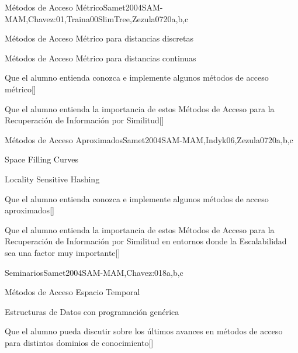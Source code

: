 \begin{syllabus}
\begin{unit}{Métodos de Acceso Métrico}{}{Samet2004SAM-MAM,Chavez:01,Traina00SlimTree,Zezula07}{20}{a,b,c}
   \begin{topics}
         \item Métodos de Acceso Métrico para distancias discretas
         \item Métodos de Acceso Métrico para distancias continuas
   \end{topics}
   \begin{learningoutcomes}
         \item Que el alumno entienda conozca e implemente algunos métodos de acceso métrico[\Usage]
         \item Que el alumno entienda la importancia de estos Métodos de Acceso para la Recuperación de Información por Similitud[\Usage]
   \end{learningoutcomes}
\end{unit}

\begin{unit}{Métodos de Acceso Aproximados}{}{Samet2004SAM-MAM,Indyk06,Zezula07}{20}{a,b,c}
   \begin{topics}
         \item Space Filling Curves
         \item Locality Sensitive Hashing
   \end{topics}
   \begin{learningoutcomes}
         \item Que el alumno entienda conozca e implemente algunos métodos de acceso aproximados[\Usage]
         \item Que el alumno entienda la importancia de estos Métodos de Acceso para la Recuperación de Información por Similitud en entornos donde la Escalabilidad sea una factor muy importante[\Usage]
   \end{learningoutcomes}
\end{unit}

\begin{unit}{Seminarios}{}{Samet2004SAM-MAM,Chavez:01}{8}{a,b,c}
	\begin{topics}
         \item Métodos de Acceso Espacio Temporal
         \item Estructuras de Datos con programación genérica
   \end{topics}
   \begin{learningoutcomes}
         \item Que el alumno pueda discutir sobre los últimos avances en métodos de acceso para distintos dominios de conocimiento[\Usage]
   \end{learningoutcomes}
\end{unit}

\begin{coursebibliography}
\end{coursebibliography}

\end{syllabus}
